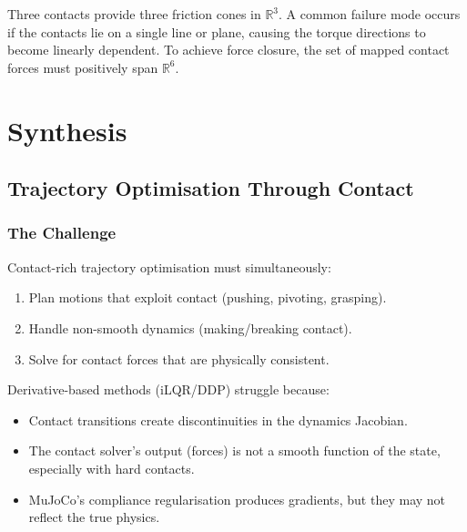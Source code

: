 \documentclass[11pt,twoside]{report}
\theoremstyle{definition}
\theoremstyle{plain}
\theoremstyle{remark}
\newcommand{\R}{\mathbb{R}}
\newcommand{\0}{\bm{0}}
\begin{document}
\begin{examplebox}
Three contacts provide three friction cones in $\R^{3}$.
A common failure mode occurs if the contacts lie on a single line or plane, causing the torque directions to become linearly dependent. To achieve force closure, the set of mapped contact forces must positively span $\R^{6}$.
\end{examplebox}

\part{Synthesis}

\chapter{Trajectory Optimisation Through Contact}
\label{ch:trajopt-contact}

\section{The Challenge}

Contact-rich trajectory optimisation must simultaneously:
\begin{enumerate}
\item Plan motions that exploit contact (pushing, pivoting, grasping).
\item Handle non-smooth dynamics (making/breaking contact).
\item Solve for contact forces that are physically consistent.
\end{enumerate}

Derivative-based methods (iLQR/DDP) struggle because:
\begin{itemize}
\item Contact transitions create discontinuities in the dynamics Jacobian.
\item The contact solver's output (forces) is not a smooth function of the state, especially with hard contacts.
\item MuJoCo's compliance regularisation produces gradients, but they may not reflect the true physics.
\end{itemize}
\end{document}
